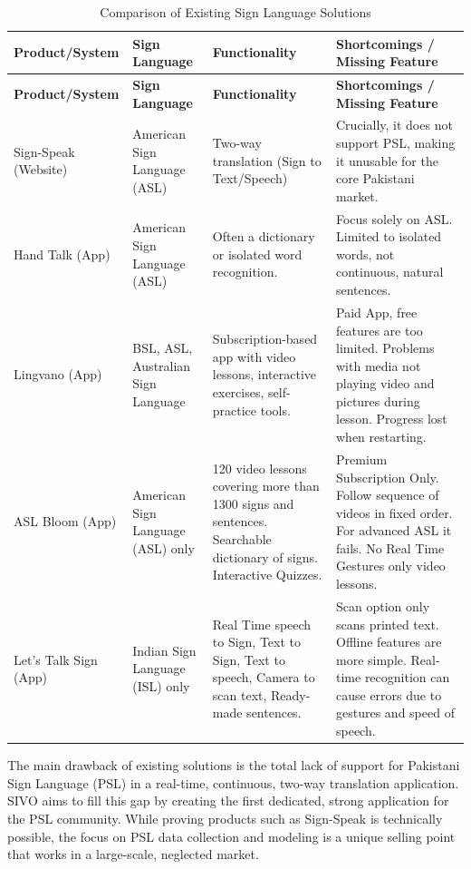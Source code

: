 \documentclass[12pt,a4paper,oneside]{report}
\begin{document}
\begin{longtable}{|p{1.0in}|p{1.1in}|p{1.7in}|p{1.7in}|}
\caption{Comparison of Existing Sign Language Solutions}\label{tab:existing}\\
\hline
\textbf{Product/System} & \textbf{Sign Language} & \textbf{Functionality} & \textbf{Shortcomings / Missing Feature} \\
\hline
\endfirsthead
\hline
\textbf{Product/System} & \textbf{Sign Language} & \textbf{Functionality} & \textbf{Shortcomings / Missing Feature} \\
\hline
\endhead
Sign-Speak (Website) & American Sign Language (ASL) & Two-way translation (Sign to Text/Speech) & Crucially, it does not support PSL, making it unusable for the core Pakistani market. \\
\hline
Hand Talk (App) & American Sign Language (ASL) & Often a dictionary or isolated word recognition. & Focus solely on ASL. Limited to isolated words, not continuous, natural sentences. \\
\hline
Lingvano (App) & BSL, ASL, Australian Sign Language & Subscription-based app with video lessons, interactive exercises, self-practice tools. & Paid App, free features are too limited. Problems with media not playing video and pictures during lesson. Progress lost when restarting. \\
\hline
ASL Bloom (App) & American Sign Language (ASL) only & 120 video lessons covering more than 1300 signs and sentences. Searchable dictionary of signs. Interactive Quizzes. & Premium Subscription Only. Follow sequence of videos in fixed order. For advanced ASL it fails. No Real Time Gestures only video lessons. \\
\hline
Let's Talk Sign (App) & Indian Sign Language (ISL) only & Real Time speech to Sign, Text to Sign, Text to speech, Camera to scan text, Ready-made sentences. & Scan option only scans printed text. Offline features are more simple. Real-time recognition can cause errors due to gestures and speed of speech. \\
\hline
\end{longtable}

The main drawback of existing solutions is the total lack of support for Pakistani Sign Language (PSL) in a real-time, continuous, two-way translation application. SIVO aims to fill this gap by creating the first dedicated, strong application for the PSL community. While proving products such as Sign-Speak is technically possible, the focus on PSL data collection and modeling is a unique selling point that works in a large-scale, neglected market.
\end{document}
